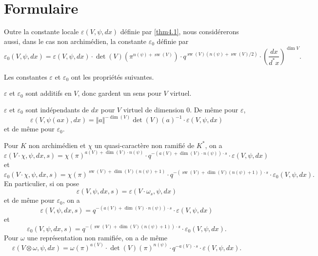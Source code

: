 \documentclass[11pt,a4paper]{amsart}
\theoremstyle{plain}
\theoremstyle{definition}
\DeclareMathOperator{\sw}{sw}
\def\dim{\mathop{\mathrm{dim}}\nolimits}
\newenvironment{para}{\par\noindent}{\par}
\newcommand{\eps}{\varepsilon}
\newcommand{\vl}{\Vert}
\newcommand{\vr}{\Vert}
\begin{document}
\section{Formulaire}

\begin{para}
Outre la constante locale $\eps(V,\psi,dx)$ d\'efinie par \ref{thm4.1}, nous consid\'ererons aussi, dans le cas non archim\'edien, la constante $\eps_{0}$ d\'efinie par
\[
\eps_{0}(V,\psi,dx) = \eps(V,\psi,dx) \cdot \det(V)(\pi^{n(\psi)+\sw(V)}) \cdot q^{\sw(V)(n(\psi)+\sw(V)/2)} \cdot \left(\frac{dx}{d^{*}x}\right)^{\dim V}.
\]
\end{para}

Les constantes $\eps$ et $\eps_{0}$ ont les propri\'et\'es suivantes.

\begin{para}\label{para5.2}
$\eps$ et $\eps_{0}$ sont additifs en $V$, donc gardent un sens pour $V$ virtuel.
\end{para}

\begin{para}
$\eps$ et $\eps_{0}$ sont ind\'ependants de $dx$ pour $V$ virtuel de dimension $0$. De m\^eme pour $\eps$,
\begin{equation}
\eps(V,\psi(ax),dx) = \vl a \vr^{-\dim(V)} \det(V)(a)^{-1} \cdot \eps(V,\psi,dx)
\end{equation}
et de m\^eme pour $\eps_{0}$.
\end{para}

\begin{para}
Pour $K$ non archim\'edien et $\chi$ un quasi-caract\`ere non ramifi\'e de $K^{*}$, on a
\begin{equation}\label{eq5.5.1}
\eps(V \cdot \chi, \psi, dx, s) = \chi(\pi)^{a(V)+\dim(V) \cdot n(\psi)} \cdot q^{-(a(V)+\dim(V) \cdot n(\psi)) \cdot s} \cdot \eps(V,\psi,dx)
\end{equation}
et
\begin{equation}
\eps_{0}(V \cdot \chi, \psi, dx, s) = \chi(\pi)^{\sw(V)+\dim(V)(n(\psi)+1)} \cdot q^{-(\sw(V)+\dim(V)(n(\psi)+1)) \cdot s} \cdot \eps_{0}(V,\psi,dx).
\end{equation}
En particulier, si on pose
\[
\eps(V,\psi,dx,s) = \eps(V \cdot \omega_{s}, \psi, dx)
\]
et de m\^eme pour $\eps_{0}$, on a
\begin{equation}\label{eq5.5.2}
\eps(V,\psi,dx,s) = q^{-(a(V)+\dim(V) \cdot n(\psi)) \cdot s} \cdot \eps(V,\psi,dx)
\end{equation}
et
\[
\eps_{0}(V,\psi,dx,s) = q^{-(\sw(V)+\dim(V)(n(\psi)+1)) \cdot s} \cdot \eps_{0}(V,\psi,dx).
\]
Pour $\omega$ une repr\'esentation non ramifi\'ee, on a de m\^eme
\begin{equation}\label{eq5.5.3}
\eps(V \otimes \omega, \psi, dx) = \omega(\pi)^{a(V)} \cdot \det(V)(\pi)^{n(\psi)} \cdot q^{-a(V) \cdot s} \cdot \eps(V,\psi,dx).
\end{equation}
\end{para}
\end{document}
